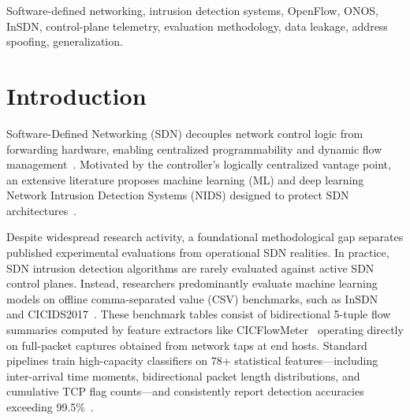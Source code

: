\documentclass[journal]{IEEEtran}
\begin{document}
\begin{abstract}
from 0.660 to 0.730; Seed~0 from 0.786 to 0.952), whereas pure inverse-frequency ($1/N_h$) collapses to 0.337 under address spoofing. A targeted audit of 12 SDN-IDS papers finds none that reports an address-disjoint split. All findings are bounded to InSDN and ONOS/Ryu. We formulate seven evaluation guidelines and release code and result files for reproducibility.
\end{abstract}

\begin{IEEEkeywords}
Software-defined networking, intrusion detection systems, OpenFlow, ONOS, InSDN, control-plane telemetry, evaluation methodology, data leakage, address spoofing, generalization.
\end{IEEEkeywords}

\section{Introduction}\label{sec:intro}
Software-Defined Networking (SDN) decouples network control logic from forwarding hardware, enabling centralized programmability and dynamic flow management~\cite{kreutz2015sdn,mckeown2008openflow}. Motivated by the controller's logically centralized vantage point, an extensive literature proposes machine learning (ML) and deep learning Network Intrusion Detection Systems (NIDS) designed to protect SDN architectures~\cite{elsayed2020insdn,ataa2024intrusion,ashikuzzaman2026sdnguardstack,optixgb2026,sajid2025ddos}.

Despite widespread research activity, a foundational methodological gap separates published experimental evaluations from operational SDN realities. In practice, SDN intrusion detection algorithms are rarely evaluated against active SDN control planes. Instead, researchers predominantly evaluate machine learning models on offline comma-separated value (CSV) benchmarks, such as InSDN~\cite{elsayed2020insdn} and CICIDS2017~\cite{sharafaldin2018cicids}. These benchmark tables consist of bidirectional 5-tuple flow summaries computed by feature extractors like CICFlowMeter~\cite{lashkari2017cicflowmeter} operating directly on full-packet captures obtained from network taps at end hosts. Standard pipelines train high-capacity classifiers on 78+ statistical features---including inter-arrival time moments, bidirectional packet length distributions, and cumulative TCP flag counts---and consistently report detection accuracies exceeding 99.5\%~\cite{optixgb2026,peerj2025intrusion,sajid2025ddos,ataa2024intrusion,ashikuzzaman2026sdnguardstack}.
\end{document}
